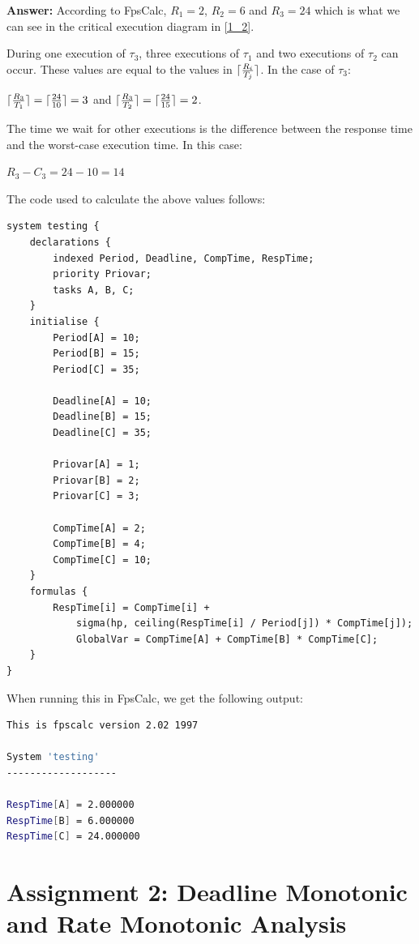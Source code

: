 \documentclass[a4paper,10pt]{article}
\DeclarePairedDelimiter{\ceil}{\lceil}{\rceil}
\newcommand{\answer}{\textbf{Answer: }}
\begin{document}
\begin{enumerate}
	\answer According to FpsCalc, $R_1 = 2$, $R_2 = 6$ and $R_3 = 24$ which is what we can see in the critical execution diagram in \ref{1_2}.
	
	During one execution of $\tau_3$, three executions of $\tau_1$ and two executions of $\tau_2$ can occur. These values are equal to the values in $\ceil{\frac{R_i}{T_j}}$. In the case of $\tau_3$:
	
	$\ceil{\frac{R_3}{T_1}} = \ceil{\frac{24}{10}} = 3$ and $\ceil{\frac{R_3}{T_2}} = \ceil{\frac{24}{15}} = 2$.
	
	The time we wait for other executions is the difference between the response time and the worst-case execution time. In this case:
	
	$R_3 - C_3 = 24 - 10 = 14$
	
	The code used to calculate the above values follows:
	
\begin{lstlisting}
system testing {
	declarations {		
		indexed Period, Deadline, CompTime, RespTime;
		priority Priovar;	
		tasks A, B, C;
	}
	initialise {
		Period[A] = 10;
		Period[B] = 15;
		Period[C] = 35;
	  
		Deadline[A] = 10;
		Deadline[B] = 15;
		Deadline[C] = 35;

		Priovar[A] = 1;
		Priovar[B] = 2;
		Priovar[C] = 3;

		CompTime[A] = 2;
		CompTime[B] = 4;
		CompTime[C] = 10;
	}
	formulas {
		RespTime[i] = CompTime[i] +
			sigma(hp, ceiling(RespTime[i] / Period[j]) * CompTime[j]);
			GlobalVar = CompTime[A] + CompTime[B] * CompTime[C];
	}
}				   
\end{lstlisting}

When running this in FpsCalc, we get the following output:

\begin{lstlisting}[language=bash]
This is fpscalc version 2.02 1997

System 'testing'
-------------------

RespTime[A] = 2.000000
RespTime[B] = 6.000000
RespTime[C] = 24.000000
\end{lstlisting}

\end{enumerate}

\section{Assignment 2: Deadline Monotonic and Rate Monotonic Analysis}
\end{document}
